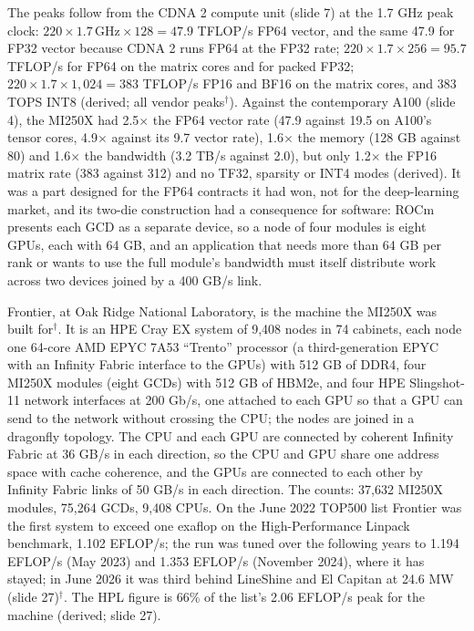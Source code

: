 \documentclass[11pt,letterpaper]{article}
\begin{document}
The peaks follow from the CDNA 2 compute unit (slide 7) at the 1.7 GHz peak clock: $220 \times 1.7\,\text{GHz} \times 128 = 47.9$ TFLOP/s FP64 vector, and the same 47.9 for FP32 vector because CDNA 2 runs FP64 at the FP32 rate; $220 \times 1.7 \times 256 = 95.7$ TFLOP/s for FP64 on the matrix cores and for packed FP32; $220 \times 1.7 \times 1{,}024 = 383$ TFLOP/s FP16 and BF16 on the matrix cores, and 383 TOPS INT8 (derived; all vendor peaks$^\dagger$). Against the contemporary A100 (slide 4), the MI250X had 2.5$\times$ the FP64 vector rate (47.9 against 19.5 on A100's tensor cores, 4.9$\times$ against its 9.7 vector rate), 1.6$\times$ the memory (128 GB against 80) and 1.6$\times$ the bandwidth (3.2 TB/s against 2.0), but only 1.2$\times$ the FP16 matrix rate (383 against 312) and no TF32, sparsity or INT4 modes (derived). It was a part designed for the FP64 contracts it had won, not for the deep-learning market, and its two-die construction had a consequence for software: ROCm presents each GCD as a separate device, so a node of four modules is eight GPUs, each with 64 GB, and an application that needs more than 64 GB per rank or wants to use the full module's bandwidth must itself distribute work across two devices joined by a 400 GB/s link.

Frontier, at Oak Ridge National Laboratory, is the machine the MI250X was built for$^\dagger$. It is an HPE Cray EX system of 9{,}408 nodes in 74 cabinets, each node one 64-core AMD EPYC 7A53 ``Trento'' processor (a third-generation EPYC with an Infinity Fabric interface to the GPUs) with 512 GB of DDR4, four MI250X modules (eight GCDs) with 512 GB of HBM2e, and four HPE Slingshot-11 network interfaces at 200 Gb/s, one attached to each GPU so that a GPU can send to the network without crossing the CPU; the nodes are joined in a dragonfly topology. The CPU and each GPU are connected by coherent Infinity Fabric at 36 GB/s in each direction, so the CPU and GPU share one address space with cache coherence, and the GPUs are connected to each other by Infinity Fabric links of 50 GB/s in each direction. The counts: 37{,}632 MI250X modules, 75{,}264 GCDs, 9{,}408 CPUs. On the June 2022 TOP500 list Frontier was the first system to exceed one exaflop on the High-Performance Linpack benchmark, 1.102 EFLOP/s; the run was tuned over the following years to 1.194 EFLOP/s (May 2023) and 1.353 EFLOP/s (November 2024), where it has stayed; in June 2026 it was third behind LineShine and El Capitan at 24.6 MW (slide 27)$^\dagger$. The HPL figure is 66\% of the list's 2.06 EFLOP/s peak for the machine (derived; slide 27).
\end{document}
